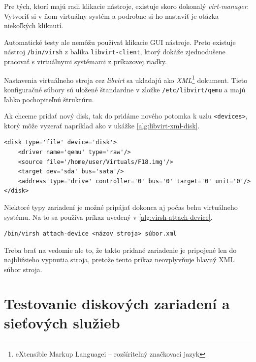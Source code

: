 Pre tých, ktorí majú radi klikacie nástroje, existuje skoro dokonalý
\emph{virt-manager}. Vytvoriť si v ňom virtuálny systém a podrobne si ho
nastaviť je otázka niekoľkých kliknutí. 

Automatické testy ale nemôžu používať klikacie GUI nástroje. Preto existuje
nástroj \texttt{/bin/virsh} z balíka \texttt{libvirt-client}, ktorý dokáže
zjednodušene pracovať s virtuálnymi systémami z príkazovej riadky.  

Nastavenia virtuálneho stroja cez \emph{libvirt} sa ukladajú ako
\emph{XML}\footnote{eXtensible Markup Languagei -- rozšíriteľný značkovací
jazyk} dokument. Tieto konfiguračné súbory sú uložené štandardne v zložke
\texttt{/etc/libvirt/qemu} a majú ľahko pochopiteľnú štruktúru.

Ak chceme pridať nový disk, tak do pridáme nového potomka k uzlu
\texttt{<devices>}, ktorý môže vyzerať napríklad ako v ukážke
\ref{alg:libvirt-xml-disk}.
\\
\renewcommand{\lstlistingname}{Ukážka}
\begin{lstlisting}[label=alg:libvirt-xml-disk,caption=Príklad diskového zariadenia pre libvirt]
<disk type='file' device='disk'>
    <driver name='qemu' type='raw'/>
    <source file='/home/user/Virtuals/F18.img'/>
    <target dev='sda' bus='sata'/>
    <address type='drive' controller='0' bus='0' target='0' unit='0'/>
</disk>
\end{lstlisting}
\renewcommand{\lstlistingname}{\listingAlgoritmus}

Niektoré typy zariadení je možné pripájať dokonca aj počas behu virtuálneho
systému. Na to sa používa príkaz uvedený v \ref{alg:virsh-attach-device}.
\\
\begin{lstlisting}[label=alg:virsh-attach-device,caption=Pripojenie zariadenia bez priamej úpravy XML súbora]
/bin/virsh attach-device <názov stroja> súbor.xml
\end{lstlisting}

Treba brať na vedomie ale to, že takto pridané zariadenie je pripojené len do
najbližsieho vypnutia stroja, pretože tento príkaz neovplyvňuje hlavný XML
súbor stroja.

%
%

\chapter{Testovanie diskových zariadení a sieťových služieb}

